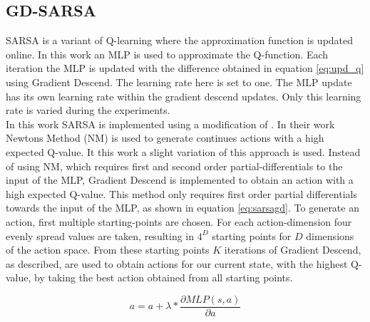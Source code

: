 
\subsection{GD-SARSA}
SARSA is a variant of Q-learning where the approximation function is updated online. In this work an MLP is used to approximate the Q-function. Each iteration the MLP is updated with the difference obtained in equation \eqref{eq:upd_q} using Gradient Descend. The learning rate here is set to one. The MLP update has its own learning rate within the gradient descend updates. Only this learning rate is varied during the experiments. \\
\newline
In this work SARSA is implemented using a modification of \cite{nichols2015continuous}. In their work Newtons Method (NM) is used to generate continues actions with a high expected Q-value.
It this work a slight variation of this approach is used. Instead of using NM, which requires first and second order partial-differentials to the input of the MLP, Gradient Descend is implemented to obtain an action with a high expected Q-value. This method only requires first order partial differentials towards the input of the MLP, as shown in equation \eqref{eq:sarsagd}.
To generate an action, first multiple starting-points are chosen. For each action-dimension four evenly spread values are taken, resulting in $4 ^ D$ starting points for $D$ dimensions of the action space. From these starting points $K$ iterations of Gradient Descend, as described, are used to obtain actions for our current state, with the highest Q-value, by taking the best action obtained from all starting points.


\begin{equation}
\label{eq:sarsagd}
a = a + \lambda * \frac{\partial MLP(s,a)}{\partial a}
\end{equation}
